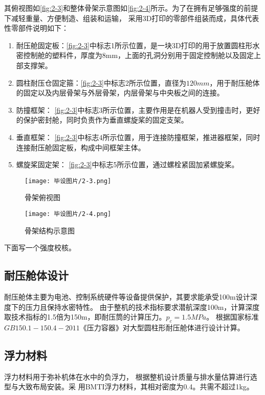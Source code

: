 其俯视图如\autoref{fig:2-3}和整体骨架示意图如\autoref{fig:2-4}所示。为了在拥有足够强度的前提下减轻重量、方便制造、组装和运输，
采用3D打印的零部件组装而成，具体代表性零部件说明如下：
\begin{enumerate}
    \item  耐压舱固定板：\autoref{fig:2-3}中标志1所示位置，是一块3D打印的用于放置圆柱形水密控制舱的塑料件，厚度为8mm，上面的孔洞分别用于固定控制舱以及固定上部支撑架。
    \item  圆柱耐压仓固定箍：\autoref{fig:2-3}中标志2所示位置，直径为$120mm$，用于耐压舱体的固定以及内层骨架与外层骨架，内层骨架与中央板之间的连接。
    \item  防撞框架：  \autoref{fig:2-3}中标志3所示位置，主要作用是在机器人受到撞击时，更好的保护密封舱，同时负责作为垂直螺旋桨的固定支架。
    \item  垂直框架：  \autoref{fig:2-3}中标志4所示位置，用于连接防撞框架，推进器框架，同时连接耐压舱固定板，构成中间框架主体。
    \item  螺旋桨固定架： \autoref{fig:2-3}中标志5所示位置，通过螺栓紧固加紧螺旋桨。
\end{enumerate}

\begin{figure}[htbp]
    \centering
    \texttt{[image: 毕设图片/2-3.png]}
    \caption{\label{fig:2-3}骨架俯视图}
\end{figure}

\begin{figure}[htbp]
    \centering
    \texttt{[image: 毕设图片/2-4.png]}
    \caption{\label{fig:2-4}骨架结构示意图}
\end{figure}


下面写一个强度校核。

\subsection{耐压舱体设计}

耐压舱体主要为电池、控制系统硬件等设备提供保护，其要求能承受100m设计深度下的压力且保持水密特性。
由于整机的技术指标要求潜航深度100m，计算深度取技术指标的1.5倍为150m，即耐压筒的计算压力。$p_c = 1.5MPa$。
根据国家标准$GB 150.1-150.4-2011$《压力容器》对大型圆柱形耐压舱体进行设计计算。
\subsection{浮力材料}
浮力材料用于弥补机体在水中的负浮力，
根据整机设计质量与排水量估算进行选型与大致布局安装。采
用BMTI浮力材料，其相对密度为0.4。共需不超过1kg。

